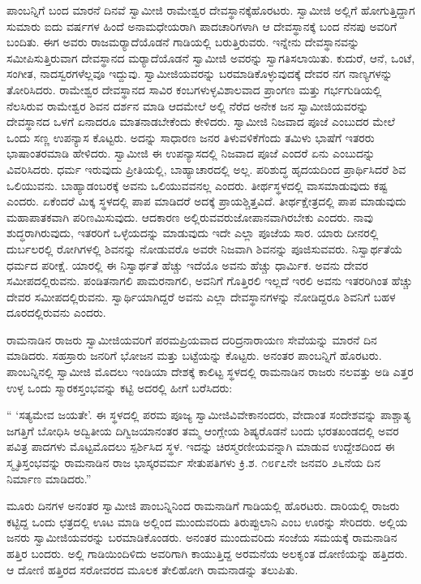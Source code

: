  ಪಾಂಬನ್ನಿಗೆ ಬಂದ ಮಾರನೆ ದಿನವೆ ಸ್ವಾಮೀಜಿ ರಾಮೇಶ್ವರ ದೇವಸ್ಥಾನಕ್ಕೆ\break ಹೊರಟರು. ಸ್ವಾಮೀಜಿ ಅಲ್ಲಿಗೆ ಹೋಗುತ್ತಿದ್ದಾಗ ಸುಮಾರು ಐದು ವರ್ಷಗಳ ಹಿಂದೆ ಅನಾಮಧೇಯರಾಗಿ ಪಾದಚಾರಿಗಳಾಗಿ ಆ ದೇವಸ್ಥಾನಕ್ಕೆ ಬಂದ ನೆನಪು ಅವರಿಗೆ ಬಂದಿತು. ಈಗ ಅವರು ರಾಜಮರ‍್ಯಾದೆಯೊಡನೆ ಗಾಡಿಯಲ್ಲಿ ಬರುತ್ತಿರುವರು. ಇನ್ನೇನು ದೇವಸ್ಥಾನವನ್ನು ಸಮೀಪಿಸುತ್ತಿರುವಾಗ ದೇವಸ್ಥಾನದ ಮರ‍್ಯಾದೆಯೊಡನೆ ಸ್ವಾಮೀಜಿ ಅವರನ್ನು ಸ್ವಾಗತಿಸಲಾಯಿತು. ಕುದುರೆ, ಆನೆ, ಒಂಟೆ, ಸಂಗೀತ, ನಾದಸ್ವರಗಳೆಲ್ಲವೂ ಇದ್ದುವು. ಸ್ವಾಮೀಜಿಯವರನ್ನು ಬರಮಾಡಿಕೊಳ್ಳುವುದಕ್ಕೆ ದೇವರ ನಗ ನಾಣ್ಯಗಳನ್ನು ತೋರಿಸಿದರು. ರಾಮೇಶ್ವರ ದೇವಸ್ಥಾನದ ಸಾವಿರ ಕಂಬಗಳುಳ್ಳ\break ವಿಶಾಲವಾದ ಪ್ರಾಂಗಣ ಮತ್ತು ಗರ್ಭಗುಡಿಯಲ್ಲಿ ನೆಲಸಿರುವ ರಾಮೇಶ್ವರ ಶಿವನ ದರ್ಶನ ಮಾಡಿ ಆದಮೇಲೆ ಅಲ್ಲಿ ನೆರೆದ ಅನೇಕ ಜನ ಸ್ವಾಮೀಜಿಯವರನ್ನು ದೇವಸ್ಥಾನದ ಒಳಗೆ ಏನಾದರೂ ಮಾತನಾಡಬೇಕೆಂದು ಕೇಳಿದರು. ಸ್ವಾಮೀಜಿ ನಿಜವಾದ ಪೂಜೆ ಎಂಬುದರ ಮೇಲೆ ಒಂದು ಸಣ್ಣ ಉಪನ್ಯಾಸ ಕೊಟ್ಟರು. ಅದನ್ನು ಸಾಧಾರಣ ಜನರ ತಿಳುವಳಿಕೆಗೆಂದು ತಮಿಳು ಭಾಷೆಗೆ ಇತರರು ಭಾಷಾಂತರಮಾಡಿ ಹೇಳಿದರು. ಸ್ವಾಮೀಜಿ ಈ ಉಪನ್ಯಾಸದಲ್ಲಿ ನಿಜವಾದ ಪೂಜೆ ಎಂದರೆ ಏನು ಎಂಬುದನ್ನು ವಿವರಿಸಿದರು. ಧರ್ಮ ಇರುವುದು ಪ್ರೀತಿಯಲ್ಲಿ, ಬಾಹ್ಯಾಚಾರದಲ್ಲಿ ಅಲ್ಲ. ಪರಿಶುದ್ಧ ಹೃದಯದಿಂದ ಪ್ರಾರ್ಥಿಸಿದರೆ ಶಿವ ಒಲಿಯುವನು. ಬಾಹ್ಯಾಡಂಬರಕ್ಕೆ ಅವನು ಒಲಿಯುವವನಲ್ಲ ಎಂದರು. ತೀರ್ಥಸ್ಥಳದಲ್ಲಿ ವಾಸಮಾಡುವುದು ಕಷ್ಟ ಎಂದರು. ಏಕೆಂದರೆ ಮಿಕ್ಕ ಸ್ಥಳದಲ್ಲಿ ಪಾಪ ಮಾಡಿದರೆ ಅದಕ್ಕೆ ಪ್ರಾಯಶ್ಚಿತ್ತವಿದೆ. ತೀರ್ಥಕ್ಷೇತ್ರದಲ್ಲಿ ಪಾಪ ಮಾಡುವುದು ಮಹಾಪಾತಕವಾಗಿ ಪರಿಣಮಿಸುವುದು. ಆದಕಾರಣ ಅಲ್ಲಿರುವವರು\break ಜೋಪಾನವಾಗಿರಬೇಕು ಎಂದರು. ನಾವು ಶುದ್ಧರಾಗಿರುವುದು, ಇತರರಿಗೆ ಒಳ್ಳೆಯದನ್ನು ಮಾಡುವುದು ಇದೇ ಎಲ್ಲಾ ಪೂಜೆಯ ಸಾರ. ಯಾರು ದೀನರಲ್ಲಿ ದುರ್ಬಲರಲ್ಲಿ ರೋಗಿಗಳಲ್ಲಿ ಶಿವನನ್ನು ನೋಡುವರೊ ಅವರೇ ನಿಜವಾಗಿ ಶಿವನನ್ನು ಪೂಜಿಸುವವರು. ನಿಸ್ವಾರ್ಥತೆಯೆ ಧರ್ಮದ ಪರೀಕ್ಷೆ. ಯಾರಲ್ಲಿ ಈ ನಿಸ್ವಾರ್ಥತೆ ಹೆಚ್ಚು ಇದೆಯೊ ಅವನು ಹೆಚ್ಚು ಧಾರ್ಮಿಕ. ಅವನು ದೇವರ ಸಮೀಪದಲ್ಲಿರುವನು. ಪಂಡಿತನಾಗಲಿ ಪಾಮರನಾಗಲಿ, ಅವನಿಗೆ ಗೊತ್ತಿರಲಿ ಇಲ್ಲದೆ ಇರಲಿ ಅವನು ಇತರರಿಗಿಂತ ಹೆಚ್ಚು ದೇವರ ಸಮೀಪದಲ್ಲಿರುವನು. ಸ್ವಾರ್ಥಿಯಾಗಿದ್ದರೆ ಅವನು ಎಲ್ಲಾ ದೇವಸ್ಥಾನಗಳನ್ನು ನೋಡಿದ್ದರೂ ಶಿವನಿಗೆ ಬಹಳ ದೂರದಲ್ಲಿರುವನು ಎಂದರು. 

 ರಾಮನಾಡಿನ ರಾಜರು ಸ್ವಾಮೀಜಿಯವರಿಗೆ ಪರಮಪ್ರಿಯವಾದ ದರಿದ್ರ\break ನಾರಾಯಣ ಸೇವೆಯನ್ನು ಮಾರನೆ ದಿನ ಮಾಡಿದರು. ಸಹಸ್ರಾರು ಜನರಿಗೆ ಭೋಜನ ಮತ್ತು ಬಟ್ಟೆಯನ್ನು ಕೊಟ್ಟರು. ಅನಂತರ ಪಾಂಬನ್ನಿಗೆ ಹೊರಟರು. ಪಾಂಬನ್ನಿನಲ್ಲಿ ಸ್ವಾಮೀಜಿ ಮೊದಲು ಇಂಡಿಯಾ ದೇಶಕ್ಕೆ ಕಾಲಿಟ್ಟ ಸ್ಥಳದಲ್ಲಿ ರಾಮನಾಡಿನ ರಾಜರು ನಲವತ್ತು ಅಡಿ ಎತ್ತರ ಉಳ್ಳ ಒಂದು ಸ್ಮಾರಕಸ್ತಂಭವನ್ನು ಕಟ್ಟಿ ಅದರಲ್ಲಿ ಹೀಗೆ ಬರೆಸಿದರು: 

 “ ‘ಸತ್ಯಮೇವ ಜಯತೇ’. ಈ ಸ್ಥಳದಲ್ಲಿ ಪರಮ ಪೂಜ್ಯ ಸ್ವಾಮೀಜಿ\break ವಿವೇಕಾನಂದರು, ವೇದಾಂತ ಸಂದೇಶವನ್ನು ಪಾಶ್ಚಾತ್ಯ ಜಗತ್ತಿಗೆ ಬೋಧಿಸಿ ಅದ್ವಿತೀಯ ದಿಗ್ವಿಜಯಾನಂತರ ತಮ್ಮ ಆಂಗ್ಲೇಯ ಶಿಷ್ಯರೊಡನೆ ಬಂದು ಭರತಖಂಡದಲ್ಲಿ ಅವರ ಪವಿತ್ರ ಪಾದಗಳು ಮೊಟ್ಟಮೊದಲು ಸ್ಪರ್ಶಿಸಿದ ಸ್ಥಳ. ಇದನ್ನು ಚಿರಸ್ಮರಣೀಯವನ್ನಾಗಿ ಮಾಡುವ ಉದ್ದೇಶದಿಂದ ಈ ಸ್ಮೃತಿಸ್ತಂಭವನ್ನು ರಾಮನಾಡಿನ ರಾಜ ಭಾಸ್ಕರವರ್ಮ ಸೇತುಪತಿಗಳು ಕ್ರಿ.ಶ. ೧೮೯೭ನೇ ಜನವರಿ ೨೬ನೆಯ ದಿನ ನಿರ್ಮಾಣ ಮಾಡಿದರು.” 

 ಮೂರು ದಿನಗಳ ಅನಂತರ ಸ್ವಾಮೀಜಿ ಪಾಂಬನ್ನಿನಿಂದ ರಾಮನಾಡಿಗೆ ಗಾಡಿಯಲ್ಲಿ ಹೊರಟರು. ದಾರಿಯಲ್ಲಿ ರಾಜರು ಕಟ್ಟಿದ್ದ ಒಂದು ಛತ್ರದಲ್ಲಿ ಊಟ ಮಾಡಿ ಅಲ್ಲಿಂದ ಮುಂದುವರಿದು ತಿರುಪ್ಪುಲಾನಿ ಎಂಬ ಊರನ್ನು ಸೇರಿದರು. ಅಲ್ಲಿಯ ಜನರು ಸ್ವಾಮೀಜಿಯವರನ್ನು ಬರಮಾಡಿಕೊಂಡರು. ಅನಂತರ ಮುಂದುವರಿದು ಸಂಜೆಯ ಸಮಯಕ್ಕೆ ರಾಮನಾಡಿನ ಹತ್ತಿರ ಬಂದರು. ಅಲ್ಲಿ ಗಾಡಿಯಿಂದಿಳಿದು ಅವರಿಗಾಗಿ ಕಾಯುತ್ತಿದ್ದ ಅರಮನೆಯ ಅಲಕೃಂತ ದೋಣಿಯನ್ನು ಹತ್ತಿದರು. ಆ ದೋಣಿ ಹತ್ತಿರದ ಸರೋವರದ ಮೂಲಕ ತೇಲಿಹೋಗಿ ರಾಮನಾಡನ್ನು ತಲುಪಿತು. 

